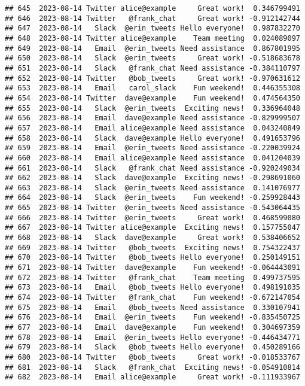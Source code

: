 \documentclass[
]{article}
\begin{document}
\begin{verbatim}
## 645  2023-08-14 Twitter alice@example     Great work!  0.346799491
## 646  2023-08-14 Twitter   @frank_chat     Great work! -0.912142744
## 647  2023-08-14   Slack  @erin_tweets Hello everyone!  0.987832270
## 648  2023-08-14 Twitter alice@example    Team meeting  0.024089097
## 649  2023-08-14   Email  @erin_tweets Need assistance  0.867801995
## 650  2023-08-14   Slack  @erin_tweets     Great work! -0.518683678
## 651  2023-08-14   Slack   @frank_chat Need assistance -0.384110797
## 652  2023-08-14 Twitter   @bob_tweets     Great work! -0.970631612
## 653  2023-08-14   Email   carol_slack    Fun weekend!  0.446355308
## 654  2023-08-14 Twitter  dave@example    Fun weekend!  0.474564350
## 655  2023-08-14   Slack  @erin_tweets  Exciting news!  0.336964048
## 656  2023-08-14   Email  dave@example Need assistance -0.829999507
## 657  2023-08-14   Email alice@example Need assistance  0.043240849
## 658  2023-08-14   Slack  dave@example Hello everyone!  0.491653796
## 659  2023-08-14   Email  @erin_tweets Need assistance -0.220039924
## 660  2023-08-14   Email alice@example Need assistance  0.041204039
## 661  2023-08-14   Slack   @frank_chat Need assistance -0.920249034
## 662  2023-08-14   Slack  dave@example  Exciting news! -0.298691060
## 663  2023-08-14   Slack  @erin_tweets Need assistance  0.141076977
## 664  2023-08-14   Slack  @erin_tweets    Fun weekend! -0.259928443
## 665  2023-08-14 Twitter  @erin_tweets Need assistance -0.543064435
## 666  2023-08-14 Twitter  @erin_tweets     Great work!  0.468599080
## 667  2023-08-14 Twitter alice@example  Exciting news!  0.157755047
## 668  2023-08-14   Slack  dave@example     Great work!  0.538406652
## 669  2023-08-14 Twitter   @bob_tweets  Exciting news!  0.754322437
## 670  2023-08-14 Twitter   @bob_tweets Hello everyone!  0.250149151
## 671  2023-08-14 Twitter  dave@example    Fun weekend! -0.064443091
## 672  2023-08-14 Twitter   @frank_chat    Team meeting  0.499737595
## 673  2023-08-14   Email   @bob_tweets Hello everyone!  0.498191035
## 674  2023-08-14 Twitter   @frank_chat    Fun weekend! -0.672147054
## 675  2023-08-14   Email   @bob_tweets Need assistance  0.330107941
## 676  2023-08-14   Email  @erin_tweets    Fun weekend! -0.835450725
## 677  2023-08-14   Email  dave@example    Fun weekend!  0.304697359
## 678  2023-08-14   Email  @erin_tweets Hello everyone! -0.446434771
## 679  2023-08-14   Slack   @bob_tweets Hello everyone!  0.450289166
## 680  2023-08-14 Twitter   @bob_tweets     Great work! -0.018533767
## 681  2023-08-14   Slack   @frank_chat  Exciting news! -0.054910814
## 682  2023-08-14   Email alice@example     Great work! -0.111933967

\end{verbatim}
\end{document}
